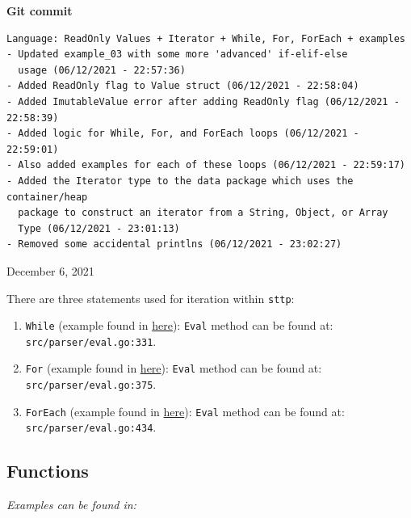 \documentclass[]{full}
\theoremstyle{definition}
\begin{document}
\begin{center}
    \textbf{Git commit}
    \begin{verbatim}
Language: ReadOnly Values + Iterator + While, For, ForEach + examples
- Updated example_03 with some more 'advanced' if-elif-else 
  usage (06/12/2021 - 22:57:36)
- Added ReadOnly flag to Value struct (06/12/2021 - 22:58:04)
- Added ImutableValue error after adding ReadOnly flag (06/12/2021 - 22:58:39)
- Added logic for While, For, and ForEach loops (06/12/2021 - 22:59:01)
- Also added examples for each of these loops (06/12/2021 - 22:59:17)
- Added the Iterator type to the data package which uses the container/heap
  package to construct an iterator from a String, Object, or Array
  Type (06/12/2021 - 23:01:13)
- Removed some accidental printlns (06/12/2021 - 23:02:27)
    \end{verbatim}
    \vspace{-1em}
    \tiny{December 6, 2021}
\end{center}

There are three statements used for iteration within \verb|sttp|:

\begin{enumerate}
    \item \verb|While| (example found in \hyperref[appendix:sttp-examples-4]{here}): \verb|Eval| method can be found at: \verb|src/parser/eval.go:331|.
    \item \verb|For| (example found in \hyperref[appendix:sttp-examples-5]{here}): \verb|Eval| method can be found at: \verb|src/parser/eval.go:375|.
    \item \verb|ForEach| (example found in \hyperref[appendix:sttp-examples-6]{here}): \verb|Eval| method can be found at: \verb|src/parser/eval.go:434|.
\end{enumerate}

\subsection{Functions}

\textit{Examples can be found in: }
\end{document}
